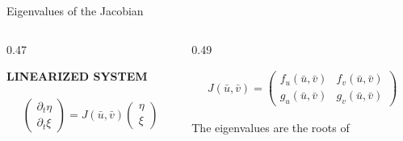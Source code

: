 \begin{frame}{Eigenvalues of the Jacobian}

\vspace{-0.38cm}

\begin{columns}[c,onlytextwidth]

  \begin{column}{0.47\textwidth}
    \centering

    {\color{HydraGold}\bfseries\fontsize{8}{9.6}\selectfont
      LINEARIZED SYSTEM
    \par}

    \vspace{-0.20cm}

    {\color{HydraWhite}\fontsize{10.2}{13}\selectfont
    \begin{align*}
      \begin{pmatrix}
        \partial_t\eta
        \\
        \partial_t\xi
      \end{pmatrix}
      =
      J(\bar u,\bar v)
      \begin{pmatrix}
        \eta
        \\
        \xi
      \end{pmatrix}
    \end{align*}
    }
  \end{column}

  \begin{column}{0.49\textwidth}
    \centering


    \vspace{-0.20cm}

    {\color{HydraWhite}\fontsize{9.2}{11.8}\selectfont
    \begin{align*}
      J(\bar u,\bar v)
      =
      \begin{pmatrix}
        f_u(\bar u,\bar v) & f_v(\bar u,\bar v)
        \\
        g_u(\bar u,\bar v) & g_v(\bar u,\bar v)
      \end{pmatrix}
    \end{align*}
    }

    \vspace{-0.34cm}

    {\color{HydraMuted}\fontsize{7.5}{9.2}\selectfont
      The eigenvalues are the roots of
    \par}


\end{column}
\end{columns}
\end{frame}
